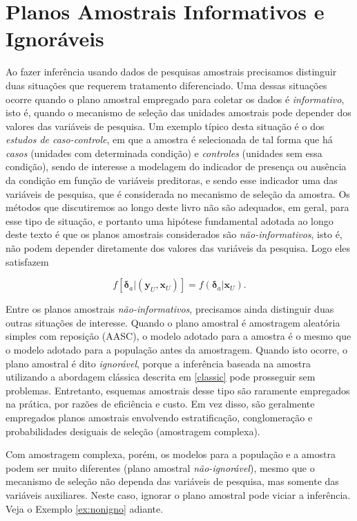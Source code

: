 \documentclass[]{book}
\numberwithin{example}{chapter}
\numberwithin{remark}{chapter}
\numberwithin{definition}{chapter}
\begin{document}
\section{Planos Amostrais Informativos e Ignoráveis}\label{inform}

Ao fazer inferência usando dados de pesquisas amostrais precisamos
distinguir duas situações que requerem tratamento diferenciado. Uma
dessas situações ocorre quando o plano amostral empregado para coletar
os dados é \emph{informativo}, isto é, quando o mecanismo de seleção das
unidades amostrais pode depender dos valores das variáveis de pesquisa.
Um exemplo típico desta situação é o dos
\emph{estudos de caso-controle}, em que a amostra é selecionada de tal
forma que há \emph{casos} (unidades com determinada condição) e
\emph{controles} (unidades sem essa condição), sendo de interesse a
modelagem do indicador de presença ou ausência da condição em função de
variáveis preditoras, e sendo esse indicador uma das variáveis de
pesquisa, que é considerada no mecanismo de seleção da amostra. Os
métodos que discutiremos ao longo deste livro não são adequados, em
geral, para esse tipo de situação, e portanto uma hipótese fundamental
adotada ao longo deste texto é que os planos amostrais considerados são
\emph{não-informativos}, isto é, não podem depender diretamente dos
valores das variáveis da pesquisa. Logo eles satisfazem

\begin{equation}
f\left[ \mathbf{\delta }_a | \left( \mathbf{y}_U , \mathbf{x}_U \right)
\right] = f\left( \mathbf{\delta }_a | \mathbf{x}_U \right) . \label{eq:ref7}
\end{equation}

Entre os planos amostrais \emph{não-informativos}, precisamos ainda
distinguir duas outras situações de interesse. Quando o plano amostral é
amostragem aleatória simples com reposição (AASC), o modelo adotado para
a amostra é o mesmo que o modelo adotado para a população antes da
amostragem. Quando isto ocorre, o plano amostral é dito
\emph{ignorável}, porque a inferência baseada na amostra utilizando a
abordagem clássica descrita em \ref{classic} pode prosseguir sem
problemas. Entretanto, esquemas amostrais desse tipo são raramente
empregados na prática, por razões de eficiência e custo. Em vez disso,
são geralmente empregados planos amostrais envolvendo estratificação,
conglomeração e probabilidades desiguais de seleção (amostragem
complexa).

Com amostragem complexa, porém, os modelos para a população e a amostra
podem ser muito diferentes (plano amostral \emph{não-ignorável}), mesmo
que o mecanismo de seleção não dependa das variáveis de pesquisa, mas
somente das variáveis auxiliares. Neste caso, ignorar o plano amostral
pode viciar a inferência. Veja o Exemplo \ref{ex:nonigno} adiante.
\end{document}
